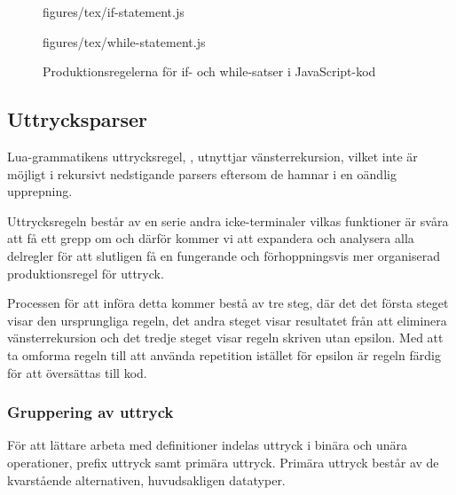 \begin{figure}[ht]
  \begin{minipage}[t]{0.5\textwidth}
    {figures/tex/if-statement.js}
  \end{minipage}
  \begin{minipage}[t]{0.5\textwidth}
    {figures/tex/while-statement.js}
  \end{minipage}
  \caption{Produktionsregelerna för if- och while-satser i JavaScript-kod}
  \label{fig:ifstat}
\end{figure}

\subsection{Uttrycksparser}

Lua-grammatikens uttrycksregel, , utnyttjar vänsterrekursion,
vilket inte är möjligt i rekursivt nedstigande parsers eftersom de hamnar i en
oändlig upprepning.

Uttrycksregeln består av en serie andra icke-terminaler vilkas funktioner är
svåra att få ett grepp om och därför kommer vi att expandera och analysera
alla delregler för att slutligen få en fungerande och förhoppningsvis mer
organiserad produktionsregel för uttryck.

Processen för att införa detta kommer bestå av tre steg, där det det första
steget visar den ursprungliga regeln, det andra steget visar resultatet från
att eliminera vänsterrekursion och det tredje steget visar regeln skriven utan epsilon.
Med att ta omforma regeln till att använda repetition istället för epsilon är
regeln färdig för att översättas till kod.

\subsubsection{Gruppering av uttryck}

För att lättare arbeta med definitioner indelas uttryck i binära och unära
operationer, prefix uttryck samt primära uttryck. Primära uttryck består av de
kvarstående alternativen, huvudsakligen datatyper.

